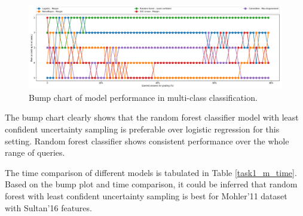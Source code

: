 	\begin{figure}[h]
		\centering
		\includegraphics[scale=0.3]{images/task1_rank}
		\caption{Bump chart of model performance in multi-class classification.}
		\label{t1_m_bump}
	\end{figure}
	
	The bump chart clearly shows that the random forest classifier model with least confident uncertainty sampling is preferable over logistic regression for this setting. Random forest classifier shows consistent performance over the whole range of queries. 
	
	The time comparison of different models is tabulated in Table \ref{task1_m_time}. Based on the bump plot and time comparison, it could be inferred that random forest with least confident uncertainty sampling is best for Mohler'11 dataset with Sultan'16 features.  
	
